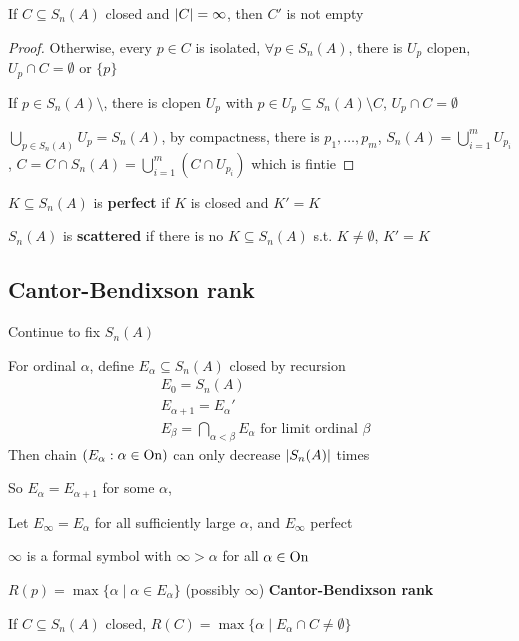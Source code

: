\documentclass[11pt]{article}
\begin{document}
\begin{proposition}[]
If \(C\subseteq S_n(A)\) closed and \(\abs{C}=\infty\), then \(C'\) is not empty
\end{proposition}

\begin{proof}
Otherwise, every \(p\in C\) is isolated, \(\forall p\in S_n(A)\), there is \(U_p\) clopen, \(U_p\cap C=\emptyset\)
or \(\{p\}\)

If \(p\in S_n(A)\setminus\), there is clopen \(U_p\) with \(p\in U_p\subseteq S_n(A)\setminus C\), \(U_p\cap C=\emptyset\)

\(\bigcup_{p\in S_n(A)}U_p=S_n(A)\), by compactness, there is \(p_1,\dots,p_m\), \(S_n(A)=\bigcup_{i=1}^mU_{p_i}\),
\(C=C\cap S_n(A)=\bigcup_{i=1}^m(C\cap U_{p_i})\) which is fintie
\end{proof}

\begin{definition}[]
\(K\subseteq S_n(A)\) is \textbf{perfect} if \(K\) is closed and \(K'=K\)

\(S_n(A)\) is \textbf{scattered} if there is no \(K\subseteq S_n(A)\) s.t. \(K\neq\emptyset\), \(K'=K\)
\end{definition}
\subsection{Cantor-Bendixson rank}
\label{sec:orgfcbe03b}
Continue to fix \(S_n(A)\)

\begin{definition}[]
For ordinal \(\alpha\), define \(E_\alpha\subseteq S_n(A)\) closed by recursion
\begin{align*}
&E_0=S_n(A)\\
&E_{\alpha+1}=E_\alpha'\\
&E_\beta=\bigcap_{\alpha<\beta}E_\alpha\text{ for limit ordinal }\beta
\end{align*}
Then chain \((E_\alpha:\alpha\in\operatorname{On})\) can only decrease \(\abs{S_n(A)}\) times

So \(E_\alpha=E_{\alpha+1}\) for some \(\alpha\),

Let \(E_\infty=E_\alpha\) for all sufficiently large \(\alpha\), and \(E_\infty\) perfect
\end{definition}

\begin{remark}
\(\infty\) is a formal symbol with \(\infty>\alpha\) for all \(\alpha\in\operatorname{On}\)
\end{remark}

\begin{definition}[]
\(R(p)=\max\{\alpha\mid\alpha\in E_\alpha\}\) (possibly \(\infty\)) \textbf{Cantor-Bendixson rank}

If \(C\subseteq S_n(A)\) closed, \(R(C)=\max\{\alpha\mid E_\alpha\cap C\neq\emptyset\}\)
\end{definition}
\end{document}
